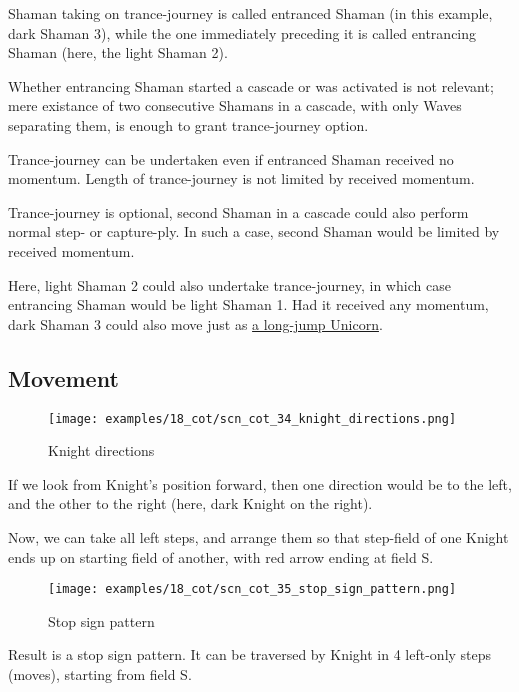 Shaman taking on trance-journey is called entranced Shaman (in this example,
dark Shaman 3), while the one immediately preceding it is called entrancing
Shaman (here, the light Shaman 2).

Whether entrancing Shaman started a cascade or was activated is not relevant;
mere existance of two consecutive Shamans in a cascade, with only Waves separating
them, is enough to grant trance-journey option.

Trance-journey can be undertaken even if entranced Shaman received no momentum.
Length of trance-journey is not limited by received momentum.

Trance-journey is optional, second Shaman in a cascade could also perform normal
step- or capture-ply. In such a case, second Shaman would be limited by received
momentum.

Here, light Shaman 2 could also undertake trance-journey, in which case entrancing
Shaman would be light Shaman 1.
Had it received any momentum, dark Shaman 3 could also move just as
\hyperref[fig:scn_cot_04_dark_shaman_step_ply]{a long-jump Unicorn}.

\clearpage %

\subsection*{Movement}
\label{sec:Conquest of Tlalocan/Trance-journey/Movement}

\noindent
\begin{wrapfigure}[10]{l}{0.4\textwidth}
\centering
\texttt{[image: examples/18\_cot/scn\_cot\_34\_knight\_directions.png]}
\caption{Knight directions}
\label{fig:scn_cot_34_knight_directions}
\end{wrapfigure}
If we look from Knight's position forward, then one direction would be to
the left, and the other to the right (here, dark Knight on the right).

Now, we can take all left steps, and arrange them so that step-field of one
Knight ends up on starting field of another, with red arrow ending at field S.


\vspace*{0.10\textheight}
\noindent
\begin{wrapfigure}[12]{l}{0.4\textwidth}
\centering
\texttt{[image: examples/18\_cot/scn\_cot\_35\_stop\_sign\_pattern.png]}
\caption{Stop sign pattern}
\label{fig:scn_cot_35_stop_sign_pattern}
\end{wrapfigure}
Result is a stop sign pattern. It can be traversed by Knight in 4 left-only
steps (moves), starting from field S.

